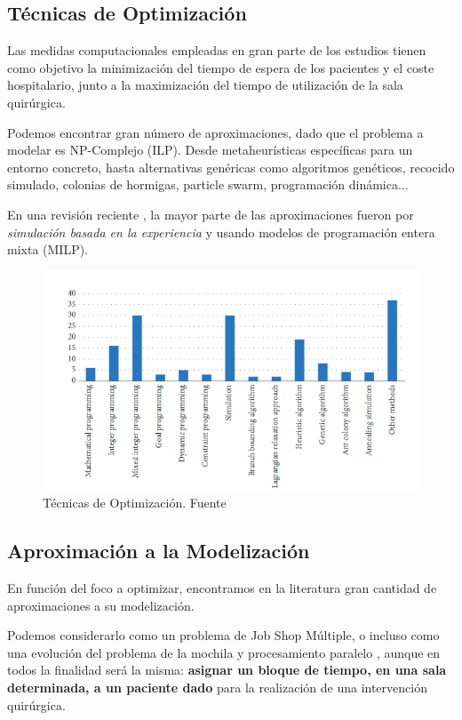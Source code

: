 \subsection{Técnicas de Optimización}

Las medidas computacionales empleadas en gran parte de los estudios tienen como objetivo la minimización del tiempo de espera de los pacientes y el coste hospitalario, junto a la maximización del tiempo de utilización de la sala quirúrgica.

Podemos encontrar gran número de aproximaciones, dado que el problema a modelar es NP-Complejo (ILP). Desde metaheurísticas específicas para un entorno concreto, hasta alternativas genéricas como algoritmos genéticos, recocido simulado, colonias de hormigas, particle swarm, programación dinámica... 

En una revisión reciente \cite{Gur2018ApplicationOverview}, la mayor parte de las aproximaciones fueron por \textit{simulación basada en la experiencia} y usando modelos de programación entera mixta (MILP).


\begin{figure}
    \centering
    \includegraphics{Memoria TFG/img/graficoAlgoritmos.png}
    \caption{Técnicas de Optimización. Fuente \cite{Gur2018ApplicationOverview}}
    \label{GraficoTecnicasOpt}
\end{figure}

\subsection{Aproximación a la Modelización}

En función del foco a optimizar, encontramos en la literatura gran cantidad de aproximaciones a su modelización.

Podemos considerarlo como un problema de Job Shop Múltiple, o incluso como una evolución del problema de la mochila y procesamiento paralelo \cite{Lin2020AScheduling}, aunque en todos la finalidad será la misma: \textbf{asignar un bloque de tiempo, en una sala determinada, a un paciente dado} para la realización de una intervención quirúrgica.

